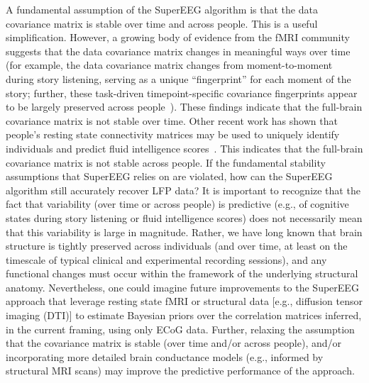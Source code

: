A fundamental assumption of the SuperEEG algorithm is that the data
covariance matrix is stable over time and across people.  This is a
useful simplification.  However, a growing body of evidence from the
fMRI community suggests that the data covariance matrix changes in
meaningful ways over time (for example, the data covariance matrix
changes from moment-to-moment during story listening, serving as a
unique ``fingerprint'' for each moment of the story; further, these
task-driven timepoint-specific covariance fingerprints appear to be
largely preserved across people~\cite{SimoEtal16, MannEtal18}).  These
findings indicate that the full-brain covariance matrix is not stable
over time.  Other recent work has shown that people's resting state
connectivity matrices may be used to uniquely identify individuals and
predict fluid intelligence scores~\cite{FinnEtal15}.  This indicates
that the full-brain covariance matrix is not stable across people.  If
the fundamental stability assumptions that SuperEEG relies on are
violated, how can the SuperEEG algorithm still accurately recover LFP
data?  It is important to recognize that the fact that variability
(over time or across people) is predictive (e.g., of cognitive states
during story listening or fluid intelligence scores) does not
necessarily mean that this variability is large in magnitude.  Rather,
we have long known that brain structure is tightly preserved across
individuals (and over time, at least on the timescale of typical
clinical and experimental recording sessions), and any functional
changes must occur within the framework of the underlying structural
anatomy.  Nevertheless, one could imagine future improvements to the
SuperEEG approach that leverage resting state fMRI or structural data
[e.g., diffusion tensor imaging (DTI)] to estimate Bayesian priors over
the correlation matrices inferred, in the current framing, using only
ECoG data.  Further, relaxing the assumption that the covariance
matrix is stable (over time and/or across people), and/or
incorporating more detailed brain conductance models (e.g., informed
by structural MRI scans) may improve the predictive performance of the
approach.



